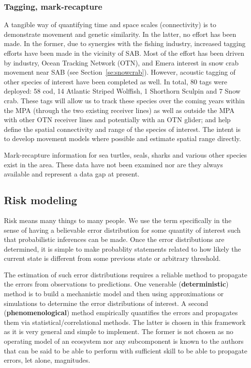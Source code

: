 \documentclass[letterpaper,portrait,11pt]{scrartcl}
\numberwithin{equation}{section}    %
\numberwithin{figure}{section}    %
\numberwithin{table}{section}       %
\begin{document}
\subsubsection{Tagging, mark-recapture}

A tangible way of quantifying time and space scales (connectivity) is to demonstrate movement and genetic similarity. In the latter, no effort has been made.  In the former, due to synergies with the fishing industry, increased tagging efforts have been made in the vicinity of SAB. Most of the effort has been driven by industry, Ocean Tracking Network (OTN), and Emera interest in snow crab movement near SAB (see Section~\ref{se:snowcrab}). However, acoustic tagging of other species of interest have been completed as well. In total, 80 tags were deployed: 58 cod, 14 Atlantic Striped Wolffish, 1 Shorthorn Sculpin and 7 Snow crab. These tags will allow us to track these species over the coming years within the MPA (through the two existing receiver lines) as well as outside the MPA with other OTN receiver lines and potentially with an OTN glider; and help define the spatial connectivity and range of the species of interest. The intent is to develop movement models where possible and estimate spatial range directly.  

Mark-recapture information for sea turtles, seals, sharks and various other species exist in the area. These data have not been examined nor are they always available and represent a data gap at present. 


\subsection{Risk modeling}
\label{sec:riskapproach}

Risk means many things to many people. We use the term specifically in the sense of having a believable error distribution for some quantity of interest such that probabilistic inferences can be made. Once the error distributions are determined, it is simple to make probablity statements related to how likely the current state is different from some previous state or arbitrary threshold. 

The estimation of such error distributions requires a reliable method to propagate the errors from observations to predictions. One venerable (\textbf{deterministic}) method is to build a mechanistic model and then using approximations or simulations to determine the error distributions of interest. A second (\textbf{phenomenological}) method empirically quantifies the errors and propagates them via statistical/correlational methods. The latter is chosen in this framework as it is very general and simple to implement. The former is not chosen as no operating model of an ecosystem nor any subcomponent is known to the authors that can be said to be able to perform with sufficient skill to be able to propagate errors, let alone, magnitudes. 
\end{document}
